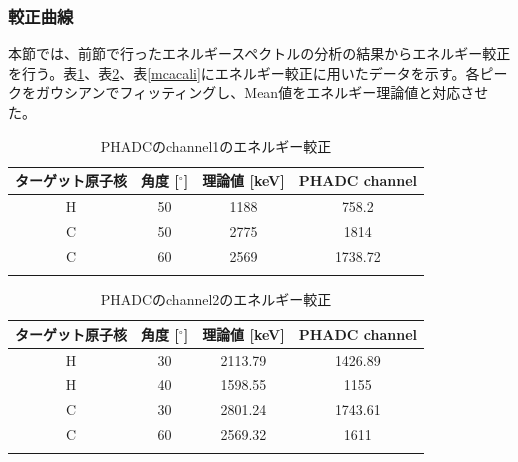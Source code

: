 \documentclass[a4paper,11pt,dvipdfmx]{jsarticle}
\begin{document}
\newpage
\subsubsection{較正曲線}
本節では、前節で行ったエネルギースペクトルの分析の結果からエネルギー較正を行う。表\ref{ch1cali}、表\ref{ch2cali}、表\ref{mcacali}にエネルギー較正に用いたデータを示す。各ピークをガウシアンでフィッティングし、Mean値をエネルギー理論値と対応させた。

\begin{table}[h]
\centering
\caption{PHADCのchannel1のエネルギー較正}
\begin{tabular}{cccc} \hline
  ターゲット原子核 & 角度 [$^\circ$] & 理論値 [keV] & PHADC channel \\ \hline
  H & 50 & 1188 & 758.2 \\ 
  C & 50 & 2775 & 1814 \\ 
  C & 60 & 2569 & 1738.72 \\ \hline
  \label{ch1cali}
  \end{tabular}
  \centering
\end{table}
\begin{table}[h]
\centering
\caption{PHADCのchannel2のエネルギー較正}
\begin{tabular}{cccc} \hline
  ターゲット原子核 & 角度 [$^\circ$] & 理論値 [keV] & PHADC channel \\ \hline
  H & 30 & 2113.79 & 1426.89 \\ 
  H & 40 & 1598.55 & 1155 \\ 
  C & 30 & 2801.24 & 1743.61 \\ 
  C & 60 & 2569.32 & 1611 \\ \hline
  \label{ch2cali}
  \end{tabular}
  \centering
\end{table}
\end{document}
